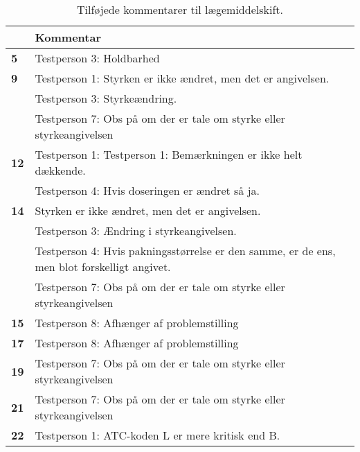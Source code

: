 \begin{table}[H]
\caption{Tilføjede kommentarer til lægemiddelskift.}
\vspace{2mm}
\label{table:resultat2}
\centering
\begin{tabular}{p{2.2cm}|p{12cm}}
\rowcolor[HTML]{C0C0C0}{\textbf{Lægemiddel nummer}} & \textbf{Kommentar} \\\hline
\cellcolor[HTML]{C0C0C0}\textbf{5} & Testperson 3: Holdbarhed \\ \hline
\cellcolor[HTML]{C0C0C0}\textbf{9}\multirow{3}{*}{} & Testperson 1: Styrken er ikke ændret, men det er angivelsen.  \\\cline{2-2}
 \cellcolor[HTML]{C0C0C0}       & Testperson 3: Styrkeændring. \\ \cline{2-2}
     \cellcolor[HTML]{C0C0C0}             &Testperson 7: Obs på om der er tale om styrke eller styrkeangivelsen \\ \hline
\cellcolor[HTML]{C0C0C0}\textbf{12}\multirow{2}{*}{} & Testperson 1: Testperson 1: Bemærkningen er ikke helt dækkende.  \\ \cline{2-2}
\cellcolor[HTML]{C0C0C0}  & Testperson 4: Hvis doseringen er ændret så ja.  \\ \hline
\cellcolor[HTML]{C0C0C0} \textbf{14} \multirow{4}{*}{} &  Styrken er ikke ændret, men det er angivelsen.  \\ \cline{2-2}
\cellcolor[HTML]{C0C0C0}			& Testperson 3: Ændring i styrkeangivelsen.  \\ \cline{2-2}
\cellcolor[HTML]{C0C0C0}                  & Testperson 4: Hvis pakningsstørrelse er den samme, er de ens, men blot forskelligt angivet. \\ \cline{2-2} \cellcolor[HTML]{C0C0C0} & Testperson 7: Obs på om der er tale om styrke eller styrkeangivelsen  \\ \hline        
\cellcolor[HTML]{C0C0C0}\textbf{15} & Testperson 8:  Afhænger af problemstilling  \\ \hline
\cellcolor[HTML]{C0C0C0}\textbf{17} & Testperson 8:  Afhænger af problemstilling  \\ \hline
\cellcolor[HTML]{C0C0C0}\textbf{19} & Testperson 7: Obs på om der er tale om styrke eller styrkeangivelsen \\ \hline
\cellcolor[HTML]{C0C0C0}\textbf{21} & Testperson 7: Obs på om der er tale om styrke eller styrkeangivelsen \\ \hline    
\cellcolor[HTML]{C0C0C0} \textbf{22}\multirow{2}{*}{} & Testperson 1: ATC-koden L er mere kritisk end B.  \\ \cline{2-2}

\end{tabular}
\end{table}

